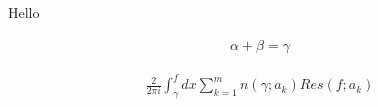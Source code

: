 \documentclass{article}
\begin{document}
Hello 

\begin{align}
\alpha + \beta = \gamma
\end{align}

\begin{align}
        \frac{2}{2\pi i}\int_{\gamma}^{f}{ dx}\sum_{k=1}^{m}{n(\gamma;a_k)Res(f;a_k)}
\end{align}
\end{document}
